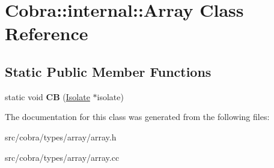 \hypertarget{class_cobra_1_1internal_1_1_array}{\section{Cobra\+:\+:internal\+:\+:Array Class Reference}
\label{class_cobra_1_1internal_1_1_array}
}
\subsection*{Static Public Member Functions}
\begin{DoxyCompactItemize}
\item 
\hypertarget{class_cobra_1_1internal_1_1_array_a3973f63b2fb645ee9b89d43cd3aed57e}{static void {\bfseries C\+B} (\hyperlink{class_cobra_1_1internal_1_1_isolate}{Isolate} $\ast$isolate)}\label{class_cobra_1_1internal_1_1_array_a3973f63b2fb645ee9b89d43cd3aed57e}

\end{DoxyCompactItemize}


The documentation for this class was generated from the following files\+:\begin{DoxyCompactItemize}
\item 
src/cobra/types/array/array.\+h\item 
src/cobra/types/array/array.\+cc\end{DoxyCompactItemize}
